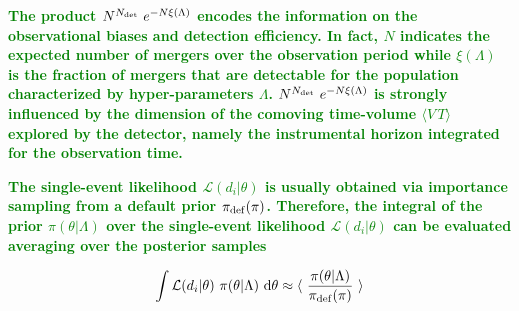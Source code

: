 \documentclass[a4paper,titlepage]{book}     	%
\newcommand{\erika}[1]{\textcolor{green}{\bf#1}}
\begin{document}
\erika{The product $N^{N_{\rm det}}~e^{-N\xi(\Lambda)}$ encodes the information on the observational biases and detection efficiency. In fact, $N$ indicates the expected number of mergers over the observation period while $\xi(\Lambda)$ is the fraction of mergers that are detectable for the population characterized by hyper-parameters $\Lambda$. $N^{N_{\rm det}}~e^{-N\xi(\Lambda)}$ is strongly influenced by the dimension of the comoving time-volume $\langle V\,T\rangle$ explored by the detector, namely the instrumental horizon integrated for the observation time.}

\erika{The single-event likelihood $\mathcal{L}(d_i|\theta)$ is usually obtained via importance sampling from a default prior $\pi_{\rm def}(\pi)$. Therefore, the integral of the prior $\pi(\theta|\Lambda)$ over the single-event likelihood $\mathcal{L}(d_i|\theta)$ can be evaluated averaging over the posterior samples}

\begin{equation}\label{eq:hyperlikelihood}
   \int \mathcal{L}(d_i|\theta)~\pi(\theta|\Lambda)~\rm d\theta \approx \langle~ \frac{\pi(\theta|\Lambda)}{\pi_{\rm def}(\pi)}~\rangle
\end{equation}
\end{document}
